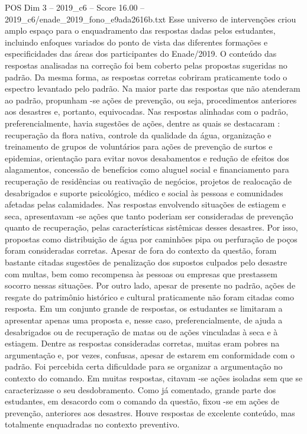 \begin{textsample}{POS Dim 3 – 2019\_c6 – Score 16.00 – 2019\_c6/enade\_2019\_fono\_e9ada2616b.txt}
Esse universo de intervenções criou amplo espaço para o enquadramento das respostas dadas pelos estudantes, incluindo enfoques variados do ponto de vista das diferentes formações e especificidades das áreas dos participantes do Enade/2019.
O conteúdo das respostas analisadas na correção foi bem coberto pelas propostas sugeridas no padrão.
Da mesma forma, as respostas corretas cobriram praticamente todo o espectro levantado pelo padrão.
Na maior parte das respostas que não atenderam ao padrão, propunham -se ações de prevenção, ou seja, procedimentos anteriores aos desastres e, portanto, equivocadas.
Nas respostas alinhadas com o padrão, preferencialmente, havia sugestões de ações, dentre as quais se destacaram : recuperação da flora nativa, controle da qualidade da água, organização e treinamento de grupos de voluntários para ações de prevenção de surtos e epidemias, orientação para evitar novos desabamentos e redução de efeitos dos alagamentos, concessão de benefícios como aluguel social e financiamento para recuperação de residências ou reativação de negócios, projetos de realocação de desabrigados e suporte psicológico, médico e social às pessoas e comunidades afetadas pelas calamidades.
Nas respostas envolvendo situações de estiagem e seca, apresentavam -se ações que tanto poderiam ser consideradas de prevenção quanto de recuperação, pelas características sistêmicas desses desastres.
Por isso, propostas como distribuição de água por caminhões pipa ou perfuração de poços foram consideradas corretas.
Apesar de fora do contexto da questão, foram bastante citadas sugestões de penalização dos supostos culpados pelo desastre com multas, bem como recompensa às pessoas ou empresas que prestassem socorro nessas situações.
Por outro lado, apesar de presente no padrão, ações de resgate do patrimônio histórico e cultural praticamente não foram citadas como resposta.
Em um conjunto grande de respostas, os estudantes se limitaram a apresentar apenas uma proposta e, nesse caso, preferencialmente, de ajuda a desabrigados ou de recuperação de matas ou de ações vinculadas à seca e à estiagem.
Dentre as respostas consideradas corretas, muitas eram pobres na argumentação e, por vezes, confusas, apesar de estarem em conformidade com o padrão.
Foi percebida certa dificuldade para se organizar a argumentação no contexto do comando.
Em muitas respostas, citavam -se ações isoladas sem que se caracterizasse o seu desdobramento.
Como já comentado, grande parte dos estudantes, em desacordo com o comando da questão, fixou -se em ações de prevenção, anteriores aos desastres.
Houve respostas de excelente conteúdo, mas totalmente enquadradas no contexto preventivo.

\end{textsample}
